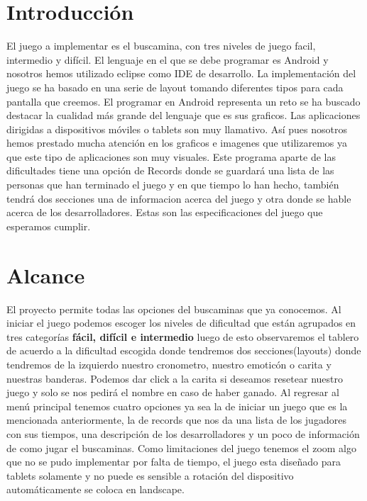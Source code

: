 \vspace*{\fill}
\newpage 


\section{Introducción}
El juego a implementar es el buscamina, con tres niveles de juego facil, intermedio y difícil. El lenguaje en el que se debe programar  es Android y nosotros hemos utilizado eclipse como IDE de desarrollo. La implementación del juego se ha basado en una serie de layout tomando diferentes tipos para cada pantalla que creemos. El programar en Android representa un reto se ha buscado destacar la cualidad más grande del lenguaje que es sus graficos. Las aplicaciones dirigidas a dispositivos móviles o tablets son muy llamativo. Así pues nosotros hemos prestado mucha atención en los graficos e imagenes que utilizaremos ya que este tipo de aplicaciones son muy visuales. Este programa aparte de las dificultades tiene una opción de Records donde se guardará una lista de las personas que han terminado el juego y en que tiempo lo han hecho, también tendrá dos secciones una de informacion acerca del juego y otra donde se hable acerca de los desarrolladores. Estas son las especificaciones del juego que esperamos  cumplir.



\section{Alcance}

El proyecto permite todas las opciones del buscaminas que ya conocemos. Al iniciar el juego podemos escoger los niveles de dificultad que están agrupados en tres categorías\textbf{ fácil, difícil e intermedio} luego de esto observaremos el tablero de acuerdo a la dificultad escogida donde tendremos dos secciones(layouts) donde tendremos de la izquierdo nuestro cronometro, nuestro emoticón o carita y nuestras banderas. Podemos dar click a la carita si deseamos resetear nuestro juego y solo se nos pedirá el nombre en caso de haber ganado. Al regresar al menú principal tenemos cuatro opciones ya sea la de iniciar un juego que es la mencionada anteriormente, la de records que nos da una lista de los jugadores con sus tiempos, una descripción de los desarrolladores y un poco de información  de como jugar el buscaminas.
Como limitaciones del juego tenemos el zoom algo que no se pudo implementar por falta de tiempo, el juego esta diseñado para tablets solamente y no puede es sensible a rotación del dispositivo automáticamente se coloca en landscape. 

